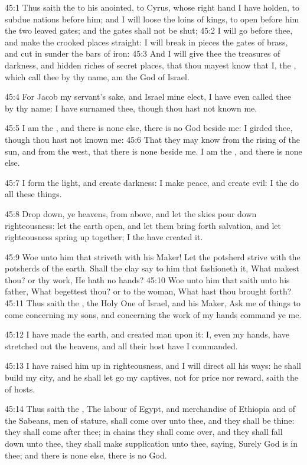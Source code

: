 45:1 Thus saith the \LORD to his anointed, to Cyrus, whose right hand I have holden, to subdue nations before him; and I will loose the loins of kings, to open before him the two leaved gates; and the gates shall not be shut; 45:2 I will go before thee, and make the crooked places straight: I will break in pieces the gates of brass, and cut in sunder the bars of iron: 45:3 And I will give thee the treasures of darkness, and hidden riches of secret places, that thou mayest know that I, the \LORD, which call thee by thy name, am the God of Israel.

45:4 For Jacob my servant's sake, and Israel mine elect, I have even called thee by thy name: I have surnamed thee, though thou hast not known me.

45:5 I am the \LORD, and there is none else, there is no God beside me: I girded thee, though thou hast not known me: 45:6 That they may know from the rising of the sun, and from the west, that there is none beside me. I am the \LORD, and there is none else.

45:7 I form the light, and create darkness: I make peace, and create evil: I the \LORD do all these things.

45:8 Drop down, ye heavens, from above, and let the skies pour down righteousness: let the earth open, and let them bring forth salvation, and let righteousness spring up together; I the \LORD have created it.

45:9 Woe unto him that striveth with his Maker! Let the potsherd strive with the potsherds of the earth. Shall the clay say to him that fashioneth it, What makest thou? or thy work, He hath no hands?  45:10 Woe unto him that saith unto his father, What begettest thou? or to the woman, What hast thou brought forth?  45:11 Thus saith the \LORD, the Holy One of Israel, and his Maker, Ask me of things to come concerning my sons, and concerning the work of my hands command ye me.

45:12 I have made the earth, and created man upon it: I, even my hands, have stretched out the heavens, and all their host have I commanded.

45:13 I have raised him up in righteousness, and I will direct all his ways: he shall build my city, and he shall let go my captives, not for price nor reward, saith the \LORD of hosts.

45:14 Thus saith the \LORD, The labour of Egypt, and merchandise of Ethiopia and of the Sabeans, men of stature, shall come over unto thee, and they shall be thine: they shall come after thee; in chains they shall come over, and they shall fall down unto thee, they shall make supplication unto thee, saying, Surely God is in thee; and there is none else, there is no God.

